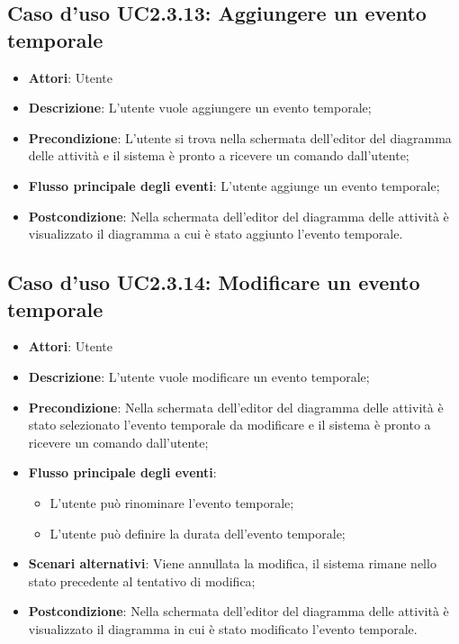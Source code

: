 \documentclass[../AnalisiDeiRequisiti.tex]{subfiles}
\begin{document}
					\subsection{Caso d'uso UC2.3.13: Aggiungere un evento temporale}
					\begin{itemize}
						\item \textbf{Attori}: Utente
						\item \textbf{Descrizione}: L'utente vuole aggiungere un evento temporale;
						\item \textbf{Precondizione}: L'utente si trova nella schermata dell'editor del diagramma delle attività e il sistema è pronto a ricevere un comando dall'utente;
						\item \textbf{Flusso principale degli eventi}: L'utente aggiunge un evento temporale;
						\item \textbf{Postcondizione}: Nella schermata dell'editor del diagramma delle attività è visualizzato il diagramma a cui è stato aggiunto l'evento temporale.
					\end{itemize}
					\subsection{Caso d'uso UC2.3.14: Modificare un evento temporale}
					\begin{itemize}
						\item \textbf{Attori}: Utente
						\item \textbf{Descrizione}: L'utente vuole modificare un evento temporale;
						\item \textbf{Precondizione}: Nella schermata dell'editor del diagramma delle attività è stato selezionato l'evento temporale da modificare e il sistema è pronto a ricevere un comando dall'utente;
						\item \textbf{Flusso principale degli eventi}: \begin{itemize}
							\item L'utente può rinominare l'evento temporale;
							\item L'utente può definire la durata dell'evento temporale;
						\end{itemize}
						\item \textbf{Scenari alternativi}: Viene annullata la modifica, il sistema rimane nello stato precedente al tentativo di modifica;
						\item \textbf{Postcondizione}: Nella schermata dell'editor del diagramma delle attività è visualizzato il diagramma in cui è stato modificato l'evento temporale.
					\end{itemize}
\end{document}
